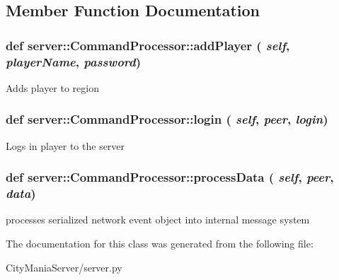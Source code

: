 \subsection{Member Function Documentation}
\hypertarget{classserver_1_1CommandProcessor_a9e1c9fcb08ab4ee46e832153cbb65b60}{
\subsubsection[{addPlayer}]{\setlength{\rightskip}{0pt plus 5cm}def server::CommandProcessor::addPlayer ( {\em self}, \/   {\em playerName}, \/   {\em password})}}
\label{classserver_1_1CommandProcessor_a9e1c9fcb08ab4ee46e832153cbb65b60}
\begin{DoxyVerb}
Adds player to region
\end{DoxyVerb}
 \hypertarget{classserver_1_1CommandProcessor_ab08f48cd02cb0b2ec77673fe3c590f27}{
\subsubsection[{login}]{\setlength{\rightskip}{0pt plus 5cm}def server::CommandProcessor::login ( {\em self}, \/   {\em peer}, \/   {\em login})}}
\label{classserver_1_1CommandProcessor_ab08f48cd02cb0b2ec77673fe3c590f27}
\begin{DoxyVerb}
Logs in player to the server
\end{DoxyVerb}
 \hypertarget{classserver_1_1CommandProcessor_acc6fe3dd91d4fdf1f62a77533c9c788a}{
\subsubsection[{processData}]{\setlength{\rightskip}{0pt plus 5cm}def server::CommandProcessor::processData ( {\em self}, \/   {\em peer}, \/   {\em data})}}
\label{classserver_1_1CommandProcessor_acc6fe3dd91d4fdf1f62a77533c9c788a}
\begin{DoxyVerb}
processes serialized network event object into internal message system
\end{DoxyVerb}
 

The documentation for this class was generated from the following file:\begin{DoxyCompactItemize}
\item 
CityManiaServer/server.py\end{DoxyCompactItemize}
